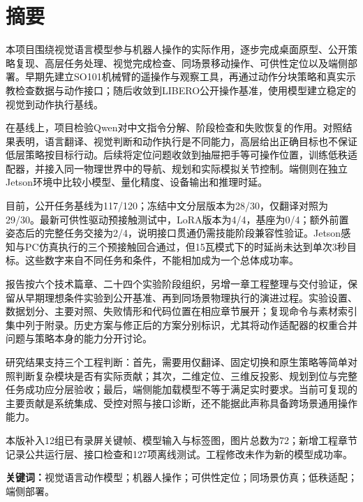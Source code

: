 \chapter*{摘要}
本项目围绕视觉语言模型参与机器人操作的实际作用，逐步完成桌面原型、公开策略复现、高层任务处理、视觉完成检查、同场景移动操作、可供性定位以及端侧部署。早期先建立SO101机械臂的遥操作与观察工具，再通过动作分块策略和真实示教检查数据与动作接口；随后收敛到LIBERO公开操作基准，使用\pifive{}模型建立稳定的视觉到动作执行基线。

在基线上，项目检验Qwen对中文指令分解、阶段检查和失败恢复的作用。对照结果表明，语言翻译、视觉判断和动作执行是不同能力，高层给出正确目标也不保证低层策略按目标行动。后续将定位问题收敛到抽屉把手等可操作位置，训练低秩适配器，并接入同一物理世界中的导航、规划和实际模拟关节控制。端侧则在独立Jetson环境中比较小模型、量化精度、设备输出和推理时延。

目前，\pifive{}公开任务基线为117/120；冻结中文分层版本为28/30，仅翻译对照为29/30。最新可供性驱动预接触测试中，LoRA版本为4/4，基座为0/4；额外前置姿态后的完整任务交接为2/4，说明接口贯通仍需技能阶段兼容性验证。Jetson感知与PC仿真执行的三个预接触回合通过，但15瓦模式下的时延尚未达到单次3秒目标。这些数字来自不同任务和条件，不能相加成为一个总体成功率。

报告按六个技术篇章、二十四个实验阶段组织，另增一章工程整理与交付验证，保留从早期理想条件实验到公开基准、再到同场景物理执行的演进过程。实验设置、数据划分、主要对照、失败情形和代码位置在相应章节展开；复现命令与素材索引集中列于附录。历史方案与修正后的方案分别标识，尤其将动作适配器的权重合并问题与策略本身的能力分开讨论。

研究结果支持三个工程判断：首先，需要用仅翻译、固定切换和原生策略等简单对照判断复杂模块是否有实际贡献；其次，二维定位、三维反投影、规划到位与完整任务成功应分层验收；最后，端侧能加载模型不等于满足实时要求。当前可复现的主要贡献是系统集成、受控对照与接口诊断，还不能据此声称具备跨场景通用操作能力。

本版补入12组已有录屏关键帧、模型输入与标签图，图片总数为72；新增工程章节记录公共运行层、接口检查和127项离线测试。工程修改未作为新的模型成功率。

\noindent\textbf{关键词：}视觉语言动作模型；机器人操作；可供性定位；同场景仿真；低秩适配；端侧部署。

